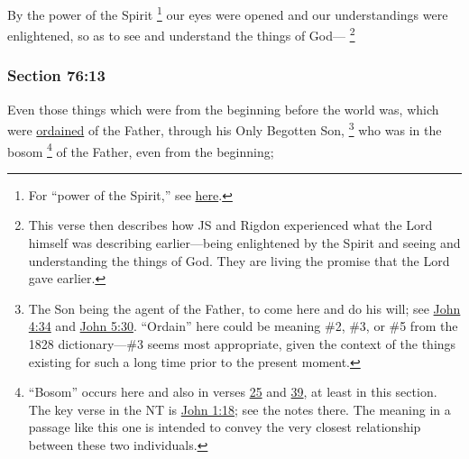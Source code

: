 		By the power of the Spirit%
			\footnote{%
				For ``power of the Spirit,'' see \hyperref[POWER-PHRASES]{here}.
				}
		our eyes were opened and our understandings were enlightened, so as to see and understand the things of God---%
			\footnote{%
				\label{DC76-12-spirit}%
				This verse then describes how JS and Rigdon experienced what the Lord himself was describing earlier---being enlightened by the Spirit and seeing and understanding the things of God. They are living the promise that the Lord gave earlier.
				}


	\subsubsection{Section 76:13} %
		\label{DC76-13}

		Even those things which were from the beginning before the world was, which were \hyperref[ORDINATION]{ordained} of the Father, through his Only Begotten Son,%
			\footnote{%
				\label{DC76-13-son}%
				The Son being the agent of the Father, to come here and do his will; see \hyperref[JOHN-4-34]{John 4:34} and \hyperref[JOHN-5-30]{John 5:30}. ``Ordain'' here could be meaning \#2, \#3, or \#5 from the 1828 dictionary---\#3 seems most appropriate, given the context of the things existing for such a long time prior to the present moment.
				}
		who was in the bosom%
			\footnote{%
				\label{DC76-13-bosom}%
				``Bosom'' occurs here and also in verses \hyperref[DC76-25]{25} and \hyperref[DC76-39]{39}, at least in this section. The key verse in the NT is \hyperref[JOHN-1-18]{John 1:18}; see the notes there. The meaning in a passage like this one is intended to convey the very closest relationship between these two individuals.
				}
		of the Father, even from the beginning;


